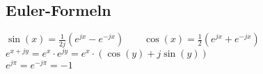 \subsection{Euler-Formeln} 
	$\sin(x) = \frac{1}{2j} \left(e^{jx} - e^{-jx}\right) \qquad
	\cos(x) = \frac{1}{2} \left(e^{jx} + e^{-jx}\right)$ \\
	$e^{x+jy} = e^x \cdot e^{jy} = e^x \cdot \left(\cos(y) + j\sin(y)\right)$ \\
	$e^{j\pi} = e^{-j\pi} = -1$ 